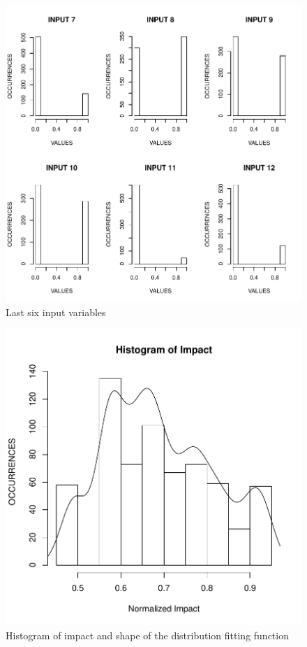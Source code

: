 \documentclass[a4paper,twoside]{article}
\begin{document}
\begin{figure}[!h]
  \vspace{-0.2cm}
  \centering
  \includegraphics[width=\columnwidth]{images/input7_12.pdf}
  \caption{Last six input variables}
  \label{fig:input712}
\end{figure}

\begin{figure}[!h]
  \vspace{-0.2cm}
  \centering
  \includegraphics[width=\columnwidth]{images/impact_histogram.pdf}
  \caption{Histogram of impact and shape of the distribution fitting function}
  \label{fig:impacthistogram}
\end{figure}
\end{document}
